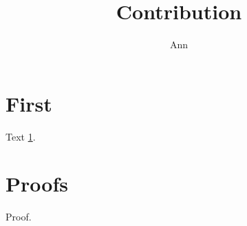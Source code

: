 \documentclass{svmult}
\begin{document}
\title*{Contribution}
\author{Ann}
\maketitle
\section{First}\label{f}
Text \ref{f}.
\appendix
\section{Proofs}
Proof.
\end{document}
